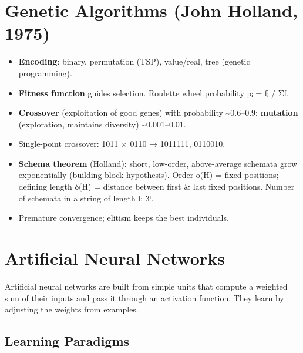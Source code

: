 \needspace{95pt}

\hypertarget{p2-10--9-genetic-algorithms-john-holland-1975}{%
\section{Genetic Algorithms (John Holland, 1975)}\label{p2-10--9-genetic-algorithms-john-holland-1975}}



\begin{itemize}
\tightlist
\item
  \textbf{Encoding}: binary, permutation (TSP), value/real, tree (genetic programming).
\item
  \textbf{Fitness function} guides selection. Roulette wheel probability pᵢ = fᵢ / Σf.
\item
  \textbf{Crossover} (exploitation of good genes) with probability \textasciitilde0.6--0.9; \textbf{mutation} (exploration, maintains diversity) \textasciitilde0.001--0.01.
\item
  Single-point crossover: 1011 × 0110 → 1011111, 0110010.
\item
  \textbf{Schema theorem} (Holland): short, low-order, above-average schemata grow exponentially (building block hypothesis). Order o(H) = fixed positions; defining length δ(H) = distance between first \& last fixed positions. Number of schemata in a string of length l: 3ˡ.
\item
  Premature convergence; elitism keeps the best individuals.
\end{itemize}

\needspace{196pt}

\hypertarget{p2-10--10-artificial-neural-networks}{%
\section{Artificial Neural Networks}\label{p2-10--10-artificial-neural-networks}}

Artificial neural networks are built from simple units that compute a weighted sum of their inputs and pass it
through an activation function. They learn by adjusting the weights from examples.

\needspace{130pt}

\hypertarget{p2-10--101-learning-paradigms}{%
\subsection{Learning Paradigms}\label{p2-10--101-learning-paradigms}}

